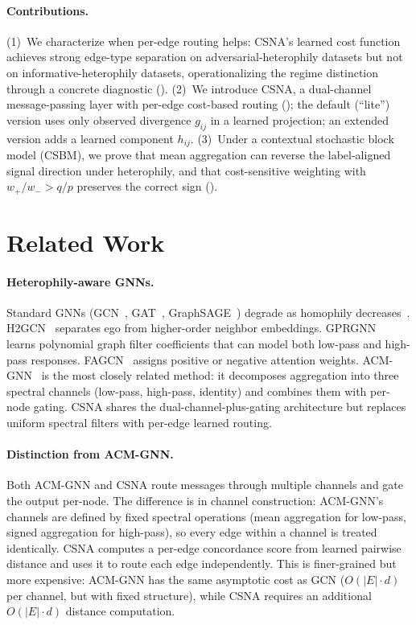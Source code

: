 \documentclass[runningheads]{llncs}
\begin{document}
\paragraph{Contributions.}
(1)~We characterize when per-edge routing helps: CSNA's learned cost function achieves strong edge-type separation on adversarial-heterophily datasets but not on informative-heterophily datasets, operationalizing the regime distinction through a concrete diagnostic ().
(2)~We introduce CSNA, a dual-channel message-passing layer with per-edge cost-based routing (); the default (``lite'') version uses only observed divergence $g_{ij}$ in a learned projection; an extended version adds a learned component $h_{ij}$.
(3)~Under a contextual stochastic block model (CSBM), we prove that mean aggregation can reverse the label-aligned signal direction under heterophily, and that cost-sensitive weighting with $w_+/w_- > q/p$ preserves the correct sign ().


\section{Related Work}\label{sec:related}

\paragraph{Heterophily-aware GNNs.}
Standard GNNs (GCN~\cite{kipf2017semi}, GAT~\cite{velickovic2018graph}, GraphSAGE~\cite{hamilton2017inductive}) degrade as homophily decreases~\cite{zhu2020beyond}.
H2GCN~\cite{zhu2020beyond} separates ego from higher-order neighbor embeddings.
GPRGNN~\cite{chien2021adaptive} learns polynomial graph filter coefficients that can model both low-pass and high-pass responses.
FAGCN~\cite{bo2021beyond} assigns positive or negative attention weights.
ACM-GNN~\cite{luan2022revisiting} is the most closely related method: it decomposes aggregation into three spectral channels (low-pass, high-pass, identity) and combines them with per-node gating.
CSNA shares the dual-channel-plus-gating architecture but replaces uniform spectral filters with per-edge learned routing.

\paragraph{Distinction from ACM-GNN.}
Both ACM-GNN and CSNA route messages through multiple channels and gate the output per-node.
The difference is in channel construction: ACM-GNN's channels are defined by fixed spectral operations (mean aggregation for low-pass, signed aggregation for high-pass), so every edge within a channel is treated identically.
CSNA computes a per-edge concordance score from learned pairwise distance and uses it to route each edge independently.
This is finer-grained but more expensive: ACM-GNN has the same asymptotic cost as GCN ($O(|E| \cdot d)$ per channel, but with fixed structure), while CSNA requires an additional $O(|E| \cdot d)$ distance computation.
\end{document}
